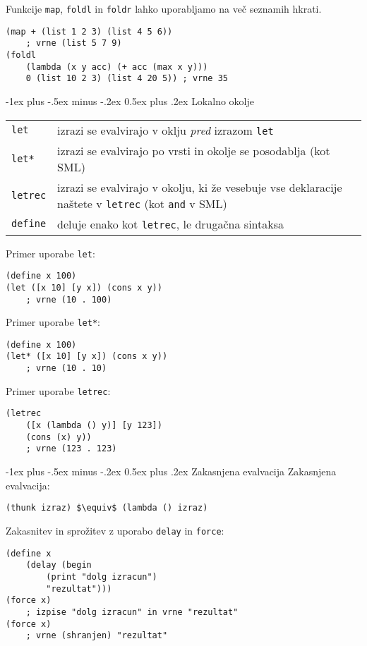 \documentclass[a3paper,9pt]{extarticle}
\makeatletter
\renewcommand{\section}{\@startsection{section}{1}{0mm}%
                                {-1ex plus -.5ex minus -.2ex}%
                                {0.5ex plus .2ex}%
                                {\normalfont\large\bfseries}}
\makeatother
\begin{document}
\begin{multicols}{4}
Funkcije \lstinline|map|, \lstinline|foldl| in \lstinline|foldr| lahko uporabljamo na več seznamih hkrati.
\begin{lstlisting}
(map + (list 1 2 3) (list 4 5 6)) 
    ; vrne (list 5 7 9)
(foldl 
    (lambda (x y acc) (+ acc (max x y))) 
    0 (list 10 2 3) (list 4 20 5)) ; vrne 35 
\end{lstlisting}

\section{Lokalno okolje}
\begin{tabular}{@{}lp{8cm}@{}}
    \lstinline|let| & izrazi se evalvirajo v oklju \textit{pred} izrazom \lstinline|let|\\
    \lstinline|let*| & izrazi se evalvirajo po vrsti in okolje se posodablja (kot SML)\\
    \lstinline|letrec| & izrazi se evalvirajo v okolju, ki že vesebuje vse deklaracije naštete v \lstinline|letrec| (kot \lstinline|and| v SML)\\
    \lstinline|define| & deluje enako kot \lstinline|letrec|, le drugačna sintaksa
\end{tabular}

Primer uporabe \lstinline|let|:
\begin{lstlisting}
(define x 100)
(let ([x 10] [y x]) (cons x y)) 
    ; vrne (10 . 100)
\end{lstlisting}

Primer uporabe \lstinline|let*|:
\begin{lstlisting}
(define x 100)
(let* ([x 10] [y x]) (cons x y)) 
    ; vrne (10 . 10)
\end{lstlisting}

Primer uporabe \lstinline|letrec|:
\begin{lstlisting}
(letrec 
    ([x (lambda () y)] [y 123]) 
    (cons (x) y)) 
    ; vrne (123 . 123)
\end{lstlisting}

\section{Zakasnjena evalvacija}
Zakasnjena evalvacija:
\begin{lstlisting}
(thunk izraz) $\equiv$ (lambda () izraz)
\end{lstlisting}

Zakasnitev in sprožitev z uporabo \lstinline|delay| in \lstinline|force|:
\begin{lstlisting}
(define x 
    (delay (begin 
        (print "dolg izracun") 
        "rezultat")))
(force x) 
    ; izpise "dolg izracun" in vrne "rezultat"
(force x) 
    ; vrne (shranjen) "rezultat"
\end{lstlisting}


\end{multicols}
\end{document}
